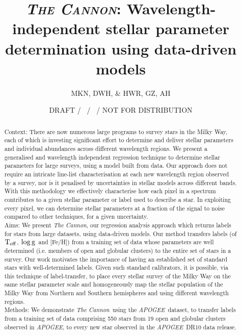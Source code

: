 \documentclass[12pt, preprint]{aastex}
\newcommand{\teff}{\mbox{$\rm T_{eff}$}}
\newcommand{\logg}{\mbox{$\rm \log g$}}
\newcommand{\tc}{\textsl{The Cannon}}
\newcommand{\apogee}{\textsl{APOGEE}}
\begin{document}
\title{\textsc{\tc:} Wavelength-independent stellar parameter determination using data-driven models}
\author{
  MKN,
  DWH,
  \&
  HWR,
  GZ, AH} 
\date{DRAFT / \gitdate\ / \githash\ / NOT FOR DISTRIBUTION}



\begin{abstract}

Context: There are now numerous large programs to survey stars in the Milky Way, each of which is investing significant effort to determine and deliver stellar parameters and individual abundances across different wavelength regions. We present a generalised and wavelength independent regression technique to determine stellar parameters for large surveys, using a model built from data. Our approach does not require an intricate line-list characterisation at each new wavelength region observed by a survey, nor is it penalised by uncertainties in stellar models across different bands. With this methodology we effectively characterise how each pixel in a spectrum contributes to a given stellar parameter or label used to describe a star. In exploiting every pixel, we can determine stellar parameters at a fraction of the signal to noise compared to other techniques, for a given uncertainty. \\
Aims: We present \tc, our regression analysis approach which returns labels for stars from large datasets, using data-driven models.  Our method transfers labels (of \teff, \logg\ and [Fe/H]) from a training set of data whose parameters are well determined (i.e. members of open and globular clusters) to the entire set of stars in a survey. Our work motivates the importance of having an established set of standard stars with well-determined labels. Given such standard calibrators, it is possible, via this technique of label-transfer, to place every stellar survey of the Milky Way on the same stellar parameter scale and homogeneously map the stellar population of the Milky Way from Northern and Southern hemispheres and using different wavelength regions. \\
Methods: We demonstrate \tc\ using the \apogee\ dataset, to transfer labels from a training set of data comprising 550 stars from 19 open and globular clusters observed in \textit{APOGEE}, to every new star observed in the \apogee\ DR10 data release. \\

\end{abstract}
\end{document}
